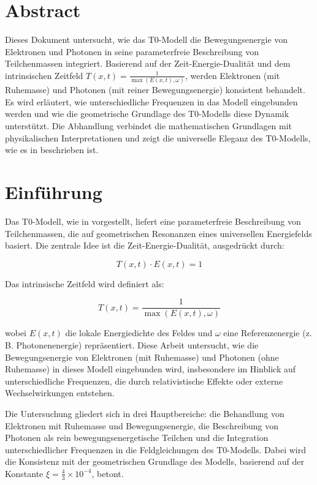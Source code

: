 \section*{Abstract}
		Dieses Dokument untersucht, wie das T0-Modell die Bewegungsenergie von Elektronen und Photonen in seine parameterfreie Beschreibung von Teilchenmassen integriert. Basierend auf der Zeit-Energie-Dualität und dem intrinsischen Zeitfeld \( T(x,t) = \frac{1}{\max(E(x,t), \omega)} \), werden Elektronen (mit Ruhemasse) und Photonen (mit reiner Bewegungsenergie) konsistent behandelt. Es wird erläutert, wie unterschiedliche Frequenzen in das Modell eingebunden werden und wie die geometrische Grundlage des T0-Modells diese Dynamik unterstützt. Die Abhandlung verbindet die mathematischen Grundlagen mit physikalischen Interpretationen und zeigt die universelle Eleganz des T0-Modells, wie es in \cite{pascher_t0_energie_2025} beschrieben ist.

	
	
	\section{Einführung}
	\label{sec:introduction}
	
	Das T0-Modell, wie in \cite{pascher_t0_energie_2025} vorgestellt, liefert eine parameterfreie Beschreibung von Teilchenmassen, die auf geometrischen Resonanzen eines universellen Energiefelds basiert. Die zentrale Idee ist die Zeit-Energie-Dualität, ausgedrückt durch:
	
	\begin{equation}
		T(x,t) \cdot E(x,t) = 1
		\label{eq:time_energy_duality}
	\end{equation}
	
	Das intrinsische Zeitfeld wird definiert als:
	
	\begin{equation}
		T(x,t) = \frac{1}{\max(E(x,t), \omega)}
		\label{eq:intrinsic_time_field}
	\end{equation}
	
	wobei \( E(x,t) \) die lokale Energiedichte des Feldes und \(\omega\) eine Referenzenergie (z. B. Photonenenergie) repräsentiert. Diese Arbeit untersucht, wie die Bewegungsenergie von Elektronen (mit Ruhemasse) und Photonen (ohne Ruhemasse) in dieses Modell eingebunden wird, insbesondere im Hinblick auf unterschiedliche Frequenzen, die durch relativistische Effekte oder externe Wechselwirkungen entstehen.
	
	Die Untersuchung gliedert sich in drei Hauptbereiche: die Behandlung von Elektronen mit Ruhemasse und Bewegungsenergie, die Beschreibung von Photonen als rein bewegungsenergetische Teilchen und die Integration unterschiedlicher Frequenzen in die Feldgleichungen des T0-Modells. Dabei wird die Konsistenz mit der geometrischen Grundlage des Modells, basierend auf der Konstante \(\xi = \frac{4}{3} \times 10^{-4}\), betont.
	
